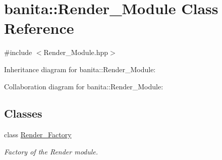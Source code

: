 \hypertarget{classbanita_1_1_render___module}{}\section{banita\+::Render\+\_\+\+Module Class Reference}
\label{classbanita_1_1_render___module}


{\ttfamily \#include $<$Render\+\_\+\+Module.\+hpp$>$}



Inheritance diagram for banita\+::Render\+\_\+\+Module\+:


Collaboration diagram for banita\+::Render\+\_\+\+Module\+:
\subsection*{Classes}
\begin{DoxyCompactItemize}
\item 
class \mbox{\hyperlink{classbanita_1_1_render___module_1_1_render___factory}{Render\+\_\+\+Factory}}
\begin{DoxyCompactList}\small\item\em Factory of the Render module. \end{DoxyCompactList}\end{DoxyCompactItemize}
